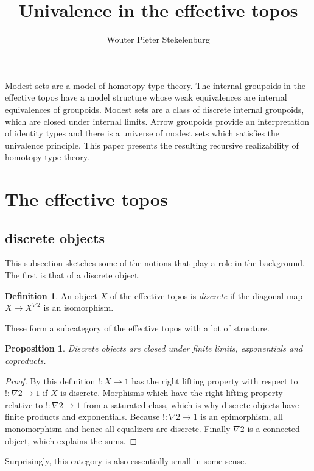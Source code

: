 \documentclass{amsart}
\title{Univalence in the effective topos}
\author[W. P. Stekelenburg]{Wouter Pieter Stekelenburg}
\theoremstyle{plain}
\newtheorem{prop}[theorem]{Proposition}
\theoremstyle{definition}
\newtheorem{defin}[theorem]{Definition}
\begin{document}
\maketitle

Modest sets are a model of homotopy type theory. The internal groupoids in the effective topos have a model structure whose weak equivalences are internal equivalences of groupoids. Modest sets are a class of discrete internal groupoids, which are closed under internal limits. Arrow groupoids provide an interpretation of identity types and there is a universe of modest sets which satisfies the univalence principle. This paper presents the resulting recursive realizability of homotopy type theory.

\section{The effective topos}

\subsection{discrete objects}
This subsection sketches some of the notions that play a role in the background. The first is that of a discrete object.

\begin{defin} An object $X$ of the effective topos is \emph{discrete} if the diagonal map $X\to X^{\nabla 2}$ is an isomorphism. \end{defin}

These form a subcategory of the effective topos with a lot of structure.

\begin{prop} Discrete objects are closed under finite limits, exponentials and coproducts. \end{prop}

\begin{proof} By this definition $!:X\to 1$ has the right lifting property with respect to $!:\nabla 2 \to 1$ if $X$ is discrete. 
Morphisms which have the right lifting property relative to $!:\nabla 2\to 1$ from a saturated class, which is why discrete objects have finite products and exponentials. Because $!:\nabla 2\to 1$ is an epimorphism, all monomorphism and hence all equalizers are discrete. Finally $\nabla 2$ is a connected object, which explains the sums. \end{proof}

Surprisingly, this category is also essentially small in some sense.
\end{document}
